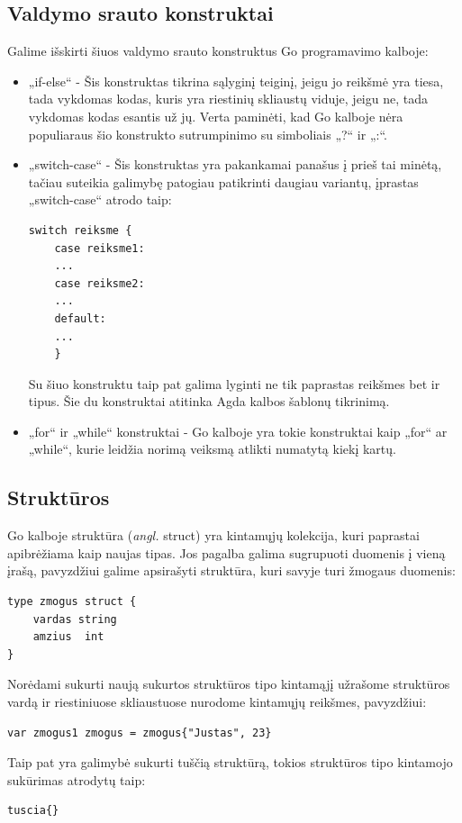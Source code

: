 \documentclass{VUMIFPSkursinis}
\begin{document}
\subsection{Valdymo srauto konstruktai}
Galime išskirti šiuos valdymo srauto konstruktus Go programavimo kalboje:
\begin{itemize}
	\item „if-else“ - Šis konstruktas tikrina sąlyginį teiginį, jeigu jo reikšmė yra tiesa, tada vykdomas kodas, kuris yra riestinių skliaustų viduje, jeigu ne, tada vykdomas kodas esantis už jų. Verta paminėti, kad Go kalboje nėra populiaraus šio konstrukto sutrumpinimo su simboliais „?“ ir „:“.
	\item {„switch-case“ - Šis konstruktas yra pakankamai panašus į prieš tai minėtą, tačiau suteikia galimybę patogiau patikrinti daugiau variantų, įprastas „switch-case“ atrodo taip:
	\begin{lstlisting}[language=GoCust]
switch reiksme {
	case reiksme1:
	...
	case reiksme2:
	...
	default:
	...
	}
	\end{lstlisting}
	Su šiuo konstruktu taip pat galima lyginti ne tik paprastas reikšmes bet ir tipus. Šie du konstruktai atitinka Agda kalbos šablonų tikrinimą.
	}
	\item „for“ ir „while“ konstruktai - Go kalboje yra tokie konstruktai kaip „for“ ar „while“, kurie leidžia norimą veiksmą atlikti numatytą kiekį kartų.
\end{itemize}
\subsection{Struktūros}
Go kalboje struktūra (\textit{angl.} struct) yra kintamųjų kolekcija, kuri paprastai apibrėžiama kaip naujas tipas. Jos pagalba galima sugrupuoti duomenis į vieną įrašą, pavyzdžiui galime apsirašyti struktūra, kuri savyje turi žmogaus duomenis:
\begin{lstlisting}[language=GoCust]
type zmogus struct {
	vardas string
	amzius  int
}
\end{lstlisting}
Norėdami sukurti naują sukurtos struktūros tipo kintamąjį užrašome struktūros vardą ir riestiniuose skliaustuose nurodome kintamųjų reikšmes, pavyzdžiui: 
\begin{lstlisting}[language=GoCust]
var zmogus1 zmogus = zmogus{"Justas", 23}
\end{lstlisting}
Taip pat yra galimybė sukurti tuščią struktūrą, tokios struktūros tipo kintamojo sukūrimas atrodytų taip: 
\begin{lstlisting}
tuscia{}
\end{lstlisting}
\end{document}
